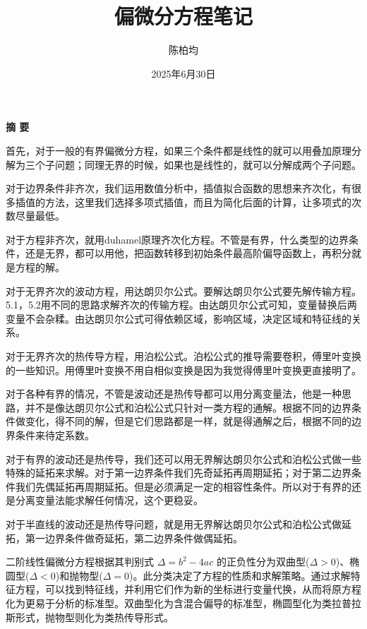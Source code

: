 \documentclass[12pt,a4paper]{article}
\title{偏微分方程笔记}
\author{陈柏均}
\date{2025年6月30日}
\numberwithin{subsection}{section}
\numberwithin{subsubsection}{subsection}
\theoremstyle{plain}
\theoremstyle{definition}
\theoremstyle{remark}
\begin{document}
	
	\maketitle

	\newpage %
\centerline{\textbf{摘 \quad \quad \quad \quad 要}}
	 首先，对于一般的有界偏微分方程，如果三个条件都是线性的就可以用叠加原理分解为三个子问题；同理无界的时候，如果也是线性的，就可以分解成两个子问题。
	 
	 对于边界条件非齐次，我们运用数值分析中，插值拟合函数的思想来齐次化，有很多插值的方法，这里我们选择多项式插值，而且为简化后面的计算，让多项式的次数尽量最低。
	 
	 对于方程非齐次，就用duhamel原理齐次化方程。不管是有界，什么类型的边界条件，还是无界，都可以用他，把函数转移到初始条件最高阶偏导函数上，再积分就是方程的解。
	 
	 对于无界齐次的波动方程，用达朗贝尔公式。要解达朗贝尔公式要先解传输方程。5.1，5.2用不同的思路求解齐次的传输方程。由达朗贝尔公式可知，变量替换后两变量不会杂糅。由达朗贝尔公式可得依赖区域，影响区域，决定区域和特征线的关系。
	 
	 对于无界齐次的热传导方程，用泊松公式。泊松公式的推导需要卷积，傅里叶变换的一些知识。用傅里叶变换不用自相似变换是因为我觉得傅里叶变换更直接明了。
	 
	 对于各种有界的情况，不管是波动还是热传导都可以用分离变量法，他是一种思路，并不是像达朗贝尔公式和泊松公式只针对一类方程的通解。根据不同的边界条件做变化，得不同的解，但是它们思路都是一样，就是得通解之后，根据不同的边界条件来待定系数。
	 
	 对于有界的波动还是热传导，我们还可以用无界解达朗贝尔公式和泊松公式做一些特殊的延拓来求解。对于第一边界条件我们先奇延拓再周期延拓；对于第二边界条件我们先偶延拓再周期延拓。但是必须满足一定的相容性条件。所以对于有界的还是分离变量法能求解任何情况，这个更稳妥。
	 
	 对于半直线的波动还是热传导问题，就是用无界解达朗贝尔公式和泊松公式做延拓，第一边界条件做奇延拓，第二边界条件做偶延拓。

二阶线性偏微分方程根据其判别式 \(\Delta = b^2 - 4ac\) 的正负性分为双曲型(\(\Delta>0\))、椭圆型(\(\Delta<0\))和抛物型(\(\Delta=0\))。此分类决定了方程的性质和求解策略。通过求解特征方程，可以找到特征线，并利用它们作为新的坐标进行变量代换，从而将原方程化为更易于分析的标准型。双曲型化为含混合偏导的标准型，椭圆型化为类拉普拉斯形式，抛物型则化为类热传导形式。

\newpage
	
	\tableofcontents  %
	
	
	\newpage
	
\end{document}

